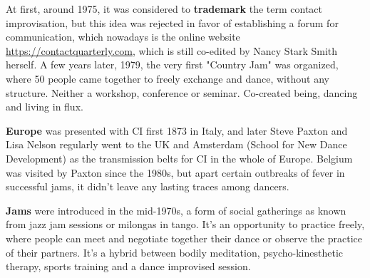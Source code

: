 At first, around 1975, it was considered to \textbf{trademark} the term contact improvisation, but this idea was rejected in favor of establishing a forum for communication, which nowadays is the online website \url{https://contactquarterly.com}, which is still co-edited by Nancy Stark Smith herself. A few years later, 1979, the very first "Country Jam" was organized, where 50 people came together to freely exchange and dance, without any structure. Neither a workshop, conference or seminar. Co-created being, dancing and living in flux.

\textbf{Europe} was presented with CI first 1873 in Italy, and later Steve Paxton and Lisa Nelson regularly went to the UK and Amsterdam (School for New Dance Development) as the transmission belts for CI in the whole of Europe. Belgium was visited by Paxton since the 1980s, but apart certain outbreaks of fever in successful jams, it didn't leave any lasting traces among dancers.

\textbf{Jams} were introduced in the mid-1970s, a form of social gatherings as known from jazz jam sessions or milongas in tango. It's an opportunity to practice freely, where people can meet and negotiate together their dance or observe the practice of their partners. It's a hybrid between bodily meditation, psycho-kinesthetic therapy, sports training and a dance improvised session.